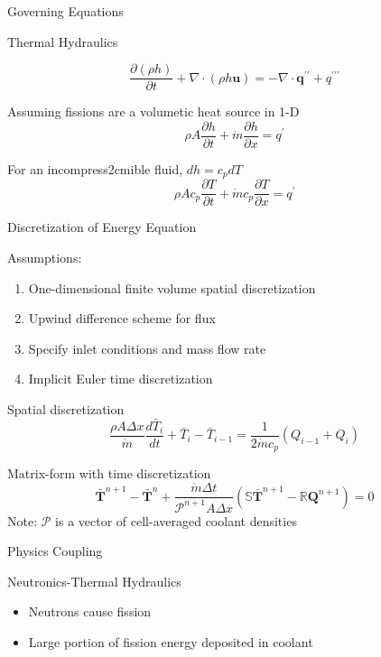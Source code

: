 \documentclass{beamer}
\begin{document}
\begin{section}{Governing Equations}
\begin{frame}{Thermal Hydraulics}
\begin{customlist}{2ex}{0pt}
  \[
   \frac{\partial\left(\rho h\right)}{\partial t}+\nabla\cdot\left(\rho h\mathbf{u}\right)=-\nabla\cdot\mathbf{q}^{\prime\prime}+q^{\prime\prime\prime}
  \]
  \vfill\item Assuming fissions are a volumetic heat source in 1-D
  \[
   \rho A\frac{\partial h}{\partial t}+\dot{m}\frac{\partial h}{\partial x}=q^{\prime}
  \]
  \vfill\item For an incompress2cmible fluid, $dh=c_{p}dT$
  \[
   \rho Ac_{p}\frac{\partial T}{\partial t}+\dot{m}c_{p}\frac{\partial T}{\partial x}=q^{\prime}
  \]
\end{customlist}
\end{frame}
\begin{frame}{Discretization of Energy Equation}
\begin{block}{Assumptions:}
\begin{enumerate}
  \item One-dimensional finite volume spatial discretization
  \item Upwind difference scheme for flux
  \item Specify inlet conditions and mass flow rate
  \item Implicit Euler time discretization
\end{enumerate}
\end{block}
\begin{customlist}{2ex}{0pt}
  \item Spatial discretization
  \[
   \frac{\rho A\Delta x}{\dot{m}}\frac{d\bar{T}_{i}}{dt}+\bar{T}_{i}-\bar{T}_{i-1}=\frac{1}{2 \dot{m} c_{p}}\left(Q_{i-1}+Q_{i}\right)
  \]
  \item Matrix-form with time discretization
  \[
   \mathbf{\bar{T}}^{n+1}-\mathbf{\bar{T}}^{n}+\frac{\dot{m} \Delta t}{\mathcal{P}^{n+1}A\Delta x}\left(\mathbb{S}\mathbf{\bar{T}}^{n+1}-\mathbb{R}\mathbf{Q}^{n+1}\right)=0
  \]
  \alert{Note:} $\mathcal{P}$ is a vector of cell-averaged coolant densities
\end{customlist}
\end{frame}
\begin{frame}{Physics Coupling}
\begin{block}{Neutronics-Thermal Hydraulics}
  \begin{itemize}
    \item Neutrons cause fission
    \item Large portion of fission energy deposited in coolant

\end{itemize}
\end{block}
\end{frame}
\end{section}
\end{document}
